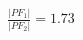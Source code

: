 \documentclass[preview]{standalone}
\begin{document}
\begin{align*}
\frac{|PF_1|}{|PF_2|} = 1.73
\end{align*}
\end{document}
